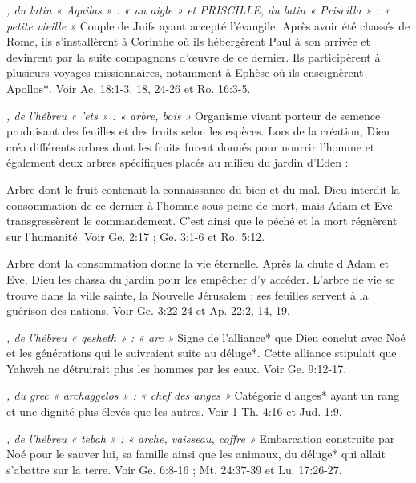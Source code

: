 \begin{multicols}{2}
{\textit{, du latin « Aquilas » : « un aigle » et PRISCILLE, du latin « Priscilla » : « petite vieille »}\newline
Couple de Juifs ayant accepté l'évangile. Après avoir été chassés de Rome, ils s'installèrent à Corinthe où ils hébergèrent Paul à son arrivée et devinrent par la suite compagnons d'œuvre de ce dernier. Ils participèrent à plusieurs voyages missionnaires, notamment à Ephèse où ils enseignèrent Apollos*. Voir Ac. 18:1-3, 18, 24-26 et Ro. 16:3-5.

\textit{, de l'hébreu « 'ets » : « arbre, bois »}\newline
Organisme vivant porteur de semence produisant des feuilles et des fruits selon les espèces. Lors de la création, Dieu créa différents arbres dont les fruits furent donnés pour nourrir l'homme et également deux arbres spécifiques placés au milieu du jardin d'Eden :

\textit{}\newline
Arbre dont le fruit contenait la connaissance du bien et du mal. Dieu interdit la consommation de ce dernier à l'homme sous peine de mort, mais Adam et Eve transgressèrent le commandement. C'est ainsi que le péché et la mort régnèrent sur l'humanité. Voir Ge. 2:17 ; Ge. 3:1-6 et Ro. 5:12.

\textit{}\newline
Arbre dont la consommation donne la vie éternelle. Après la chute d'Adam et Eve, Dieu les chassa du jardin pour les empêcher d'y accéder. L'arbre de vie se trouve dans la ville sainte, la Nouvelle Jérusalem ; ses feuilles servent à la guérison des nations. Voir Ge. 3:22-24 et Ap. 22:2, 14, 19.

\textit{, de l'hébreu « qesheth » : « arc »}\newline
Signe de l'alliance* que Dieu conclut avec Noé et les générations qui le suivraient suite au déluge*. Cette alliance stipulait que Yahweh ne détruirait plus les hommes par les eaux. Voir Ge. 9:12-17.

\textit{, du grec « archaggelos » : « chef des anges »}\newline
Catégorie d'anges* ayant un rang et une dignité plus élevés que les autres. Voir 1 Th. 4:16 et Jud. 1:9.

\textit{, de l'hébreu « tebah » : « arche, vaisseau, coffre »}\newline
Embarcation construite par Noé pour le sauver lui, sa famille ainsi que les animaux, du déluge* qui allait s'abattre sur la terre. Voir Ge. 6:8-16 ; Mt. 24:37-39 et Lu. 17:26-27.

}
\end{multicols}
